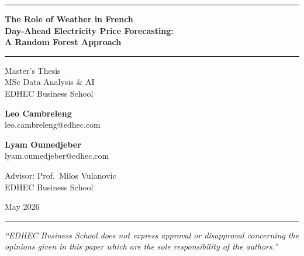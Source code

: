 \documentclass[12pt, a4paper, oneside]{report}
\begin{document}
\begin{titlepage}
  \centering
  \vspace*{1cm}

  {\color{edhec}\rule{\linewidth}{2pt}}
  \vspace{0.5cm}

  {\LARGE\bfseries\color{edhec}
    The Role of Weather in French\\[6pt]
    Day-Ahead Electricity Price Forecasting:\\[6pt]
    A Random Forest Approach
  \par}

  \vspace{0.5cm}
  {\color{edhec}\rule{\linewidth}{1pt}}
  \vspace{1.5cm}

  {\large Master's Thesis\\[4pt]
   MSc Data Analysis \& AI\\[4pt]
   EDHEC Business School}

  \vspace{2cm}

  {\large\bfseries Leo Cambreleng}\\[6pt]
  {\normalsize leo.cambreleng@edhec.com}

  \vspace{1cm}

  {\large\bfseries Lyam Oumedjeber}\\[6pt]
  {\normalsize lyam.oumedjeber@edhec.com}

  \vspace{2cm}

  {\normalsize Advisor: Prof.\ Milos Vulanovic\\[4pt]
   EDHEC Business School}

  \vspace{2cm}

  {\large May 2026}

  \vfill
  {\color{edhec}\rule{\linewidth}{2pt}}
\end{titlepage}

\thispagestyle{empty}
\vspace*{3cm}
\begin{center}
  \textit{``EDHEC Business School does not express approval or disapproval concerning the opinions given in this paper which are the sole responsibility of the authors.''}
\end{center}
\end{document}
